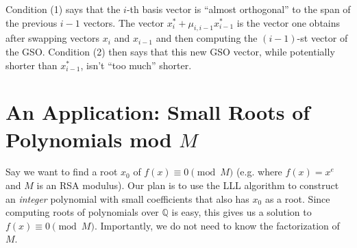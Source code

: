 \documentclass[11pt,letterpaper]{article}
\newcommand{\rationals}{\mathbb{Q}}
\theoremstyle{definition}
\begin{document}

\noindent Condition (1) says that the $i$-th basis vector is ``almost orthogonal'' to the span of the previous $i-1$ vectors. The vector $x_i^*+\mu_{i, i-1}x_{i-1}^*$ is the vector one obtains after swapping vectors $x_i$ and $x_{i-1}$ and then computing the $(i-1)$-st vector of the GSO. Condition (2) then says that this new GSO vector, while potentially shorter than $x_{i-1}^*$, isn't ``too much'' shorter.

\section{An Application: Small Roots of Polynomials mod $M$}
Say we want to find a root $x_0$ of $f(x) \equiv 0 \pmod{M}$ (e.g. where $f(x) = x^e$ and $M$ is an RSA modulus). Our plan is to use the LLL algorithm to construct an \textit{integer} polynomial with small coefficients that also has $x_0$ as a root. Since computing roots of polynomials over $\rationals$ is easy, this gives us a solution to $f(x)\equiv 0 \pmod{M}$. Importantly, we do not need to know the factorization of $M$.
\end{document}
